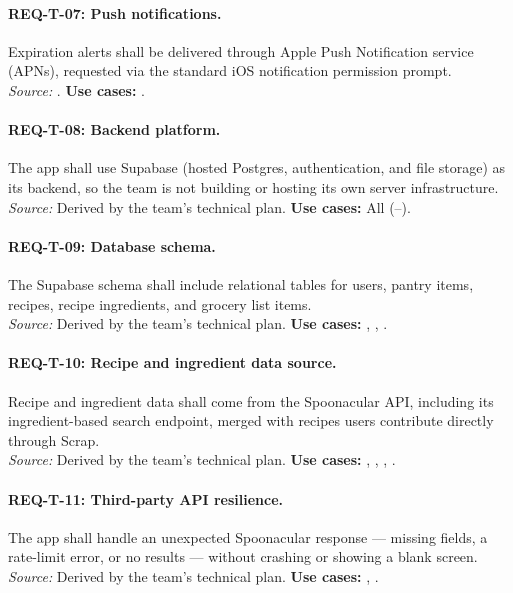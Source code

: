 \paragraph{REQ-T-07: Push notifications.}
 Expiration alerts shall be delivered through Apple Push Notification service (APNs), requested via the standard iOS notification permission prompt.\\
\textit{Source:} . \textbf{Use cases:} .

\paragraph{REQ-T-08: Backend platform.}
 The app shall use Supabase (hosted Postgres, authentication, and file storage) as its backend, so the team is not building or hosting its own server infrastructure.\\
\textit{Source:} Derived by the team's technical plan. \textbf{Use cases:} All (--).

\paragraph{REQ-T-09: Database schema.}
 The Supabase schema shall include relational tables for users, pantry items, recipes, recipe ingredients, and grocery list items.\\
\textit{Source:} Derived by the team's technical plan. \textbf{Use cases:} , , .

\paragraph{REQ-T-10: Recipe and ingredient data source.}
 Recipe and ingredient data shall come from the Spoonacular API, including its ingredient-based search endpoint, merged with recipes users contribute directly through Scrap.\\
\textit{Source:} Derived by the team's technical plan. \textbf{Use cases:} , , , .

\paragraph{REQ-T-11: Third-party API resilience.}
 The app shall handle an unexpected Spoonacular response --- missing fields, a rate-limit error, or no results --- without crashing or showing a blank screen.\\
\textit{Source:} Derived by the team's technical plan. \textbf{Use cases:} , .

